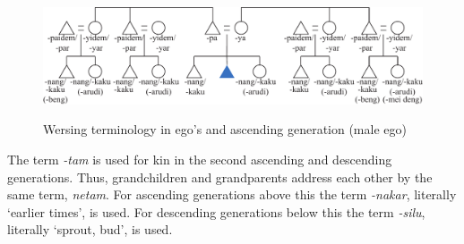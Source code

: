 \begin{figure}
\includegraphics[width=\textwidth]{figures/Holton_ch5_fig14.pdf}
\label{fig14_wersing}
\caption{Wersing terminology in ego's and ascending generation (male ego)}
\end{figure}


The term \textit{-tam} is used for kin in the second ascending and descending generations. Thus, grandchildren and grandparents address each other by the same term, \textit{netam}. For ascending generations above this the term \textit{\mbox{-}nakar}, literally `earlier times', is used. For descending generations below this the term \textit{{}-silu}, literally `sprout, bud', is used. 
 

